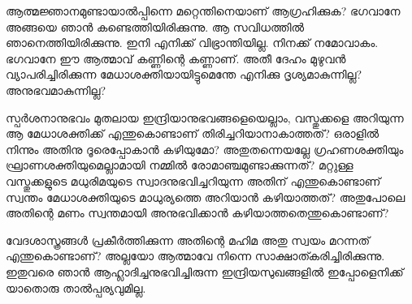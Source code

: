ആത്മജ്ഞാനമുണ്ടായാല്‍പ്പിന്നെ മറ്റെന്തിനെയാണ് ആഗ്രഹിക്കുക? ഭഗവാനേ അങ്ങയെ ഞാന്‍ കണ്ടെത്തിയിരിക്കുന്നു. ആ സവിധത്തില്‍ ഞാനെത്തിയിരിക്കുന്നു. ഇനി എനിക്ക് വിഭ്രാന്തിയില്ല. നിനക്ക് നമോവാകം. ഭഗവാനേ ഈ ആത്മാവ് കണ്ണിന്റെ കണ്ണാണ്. അതീ ദേഹം മുഴുവന്‍ വ്യാപരിച്ചിരിക്കുന്ന  മേധാശക്തിയായിട്ടുമെന്തേ എനിക്കു ദൃശ്യമാകുന്നില്ല? അനുഭവമാകുന്നില്ല?

സ്പര്‍ശനാനുഭവം മുതലായ ഇന്ദ്രിയാനുഭവങ്ങളെയെല്ലാം, വസ്തുക്കളെ അറിയുന്ന ആ മേധാശക്തിക്ക് എന്തുകൊണ്ടാണ് തിരിച്ചറിയാനാകാത്തത്? ഒരാളില്‍ നിന്നും അതിനു ദൂരെപ്പോകാന്‍ കഴിയുമോ? അതുതന്നെയല്ലേ ഗ്രഹണശക്തിയും ഘ്രാണശക്തിയുമെല്ലാമായി നമ്മില്‍ രോമാഞ്ചമുണ്ടാക്കുന്നത്? മറ്റുള്ള വസ്തുക്കളുടെ മധുരിമയുടെ സ്വാദനുഭവിച്ചറിയുന്ന അതിന് എന്തുകൊണ്ടാണ് സ്വന്തം മേധാശക്തിയുടെ മാധുര്യത്തെ അറിയാന്‍ കഴിയാത്തത്? അതുപോലെ അതിന്റെ മണം സ്വന്തമായി അനുഭവിക്കാന്‍ കഴിയാത്തതെന്തുകൊണ്ടാണ്?

വേദശാസ്ത്രങ്ങള്‍ പ്രകീര്‍ത്തിക്കുന്ന അതിന്റെ മഹിമ അതു സ്വയം മറന്നത് എന്തുകൊണ്ടാണ്? അല്ലയോ ആത്മാവേ നിന്നെ സാക്ഷാത്കരിച്ചിരിക്കുന്നു. ഇതുവരെ ഞാന്‍ ആഹ്ലാദിച്ചനുഭവിച്ചിരുന്ന ഇന്ദ്രിയസുഖങ്ങളില്‍ ഇപ്പോളെനിക്ക് യാതൊരു താല്‍പ്പര്യവുമില്ല.